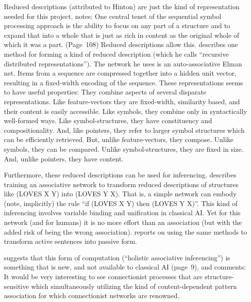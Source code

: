 Reduced descriptions (attributed to Hinton) are just the kind of
representation needed for this project.   notes:
\bssq
One central tenet of the sequential symbol processing approach is the
ability to focus on any part of a structure and to expand that into a
whole that is just as rich in content as the original whole of which
it was a part. (Page~108)
\essq
Reduced descriptions allow this.   describes one method
for forming a kind of reduced description (which he calls ``recursive
distributed representations'').  The network he
uses is an auto-associative Elman net.  Items from a sequence are
compressed together into a hidden unit vector, resulting in a
fixed-width encoding of the sequence.  These representations seems to
have useful properties:
\bssq
They combine aspects of several disparate representations. Like
feature-vectors they are fixed-width, similarity based, and their
content is easily accessible.  Like symbols, they combine only in
syntactically well-formed ways. Like symbol-structures, they have
constituency and compositionality. And, like pointers, they refer to
larger symbol structures which can be efficiently retrieved. But,
unlike feature-vectors, they compose. Unlike symbols, they can be
compared. Unlike symbol-structures, they are fixed in size. And,
unlike pointers, they have content.

\hfill \cite[page 529/530]{pollimpl}
\essq

Furthermore, these reduced descriptions can be used
for inferencing.   describes training an associative
network to transform reduced descriptions of structures
like (LOVES X Y) into (LOVES Y X).  That is, a simple network can
embody (note, implicitly) the
rule ``if (LOVES X Y) then (LOVES Y X)''. This kind of
inferencing involves variable binding and unification in classical
AI.  Yet for this network (and for humans) it is no more effort than
an association (but with the added risk of being the wrong
association).  reports on using the same methods to
transform active sentences into passive form.

 suggests that this form of computation (``holistic
associative inferencing'') is something that is new, and not available
to classical AI (page~9), and comments:
\bssq
It would be very interesting to see connectionist processes that are
structure-sensitive which simultaneously utilizing the kind of
content-dependent pattern association for which connectionist networks
are renowned.
\essq

